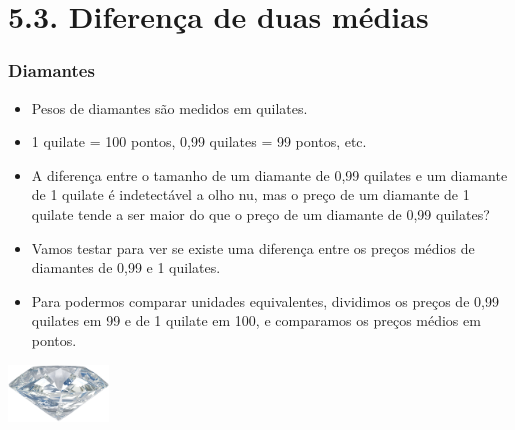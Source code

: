 
\section{5.3. Diferença de duas médias}


\begin{frame}
\frametitle{Diamantes}

\begin{itemize}
\justifying
\item Pesos de diamantes são medidos em quilates. 
\justifying
\item 1 quilate = 100 pontos, 0,99 quilates = 99 pontos, etc.
\justifying
\item A diferença entre o tamanho de um diamante de 0,99 quilates e um diamante de 1 quilate é indetectável a olho nu, mas o preço de um diamante de 1 quilate tende a ser maior do que o preço de um diamante de 0,99 quilates?
\justifying
\item Vamos testar para ver se existe uma diferença entre os preços médios de diamantes de 0,99 e 1 quilates.
\justifying
\item Para podermos comparar unidades equivalentes, dividimos os preços de 0,99 quilates em 99 e de 1 quilate em 100, e comparamos os preços médios em pontos.

\end{itemize}

\hfill \includegraphics[width=0.2\textwidth]{5-3_diff_two_mean/diamond.png}

\end{frame}



